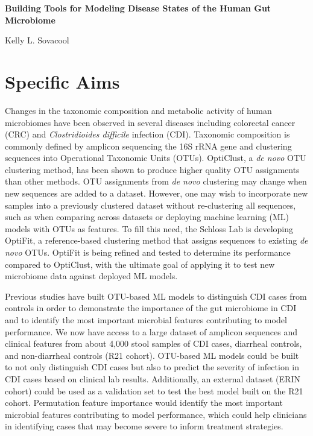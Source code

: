 \documentclass[11pt]{article}
\begin{document}
\sloppy
\begin{center}
\large{\textbf{
    Building Tools for Modeling Disease States of the Human Gut Microbiome
}}

\vspace{11pt}

\small{
    Kelly L. Sovacool
}
\end{center}

\section*{Specific Aims}

Changes in the taxonomic composition and metabolic activity of human microbiomes
have been observed in several diseases including colorectal cancer (CRC) and
\textit{Clostridioides difficile} infection (CDI).
Taxonomic composition is commonly defined by amplicon sequencing the 16S rRNA
gene and clustering sequences into Operational Taxonomic Units (OTUs).
OptiClust, a \textit{de novo} OTU clustering method, has been
shown to produce higher quality OTU assignments than other methods.
OTU assignments from \textit{de novo} clustering may
change when new sequences are added to a dataset.
However, one may wish to incorporate new samples into a previously clustered
dataset without re-clustering all sequences, such as when
comparing across datasets or deploying machine learning (ML) models with OTUs as
features.
To fill this need, the Schloss Lab is developing OptiFit, a reference-based
clustering method that assigns sequences to existing \textit{de novo} OTUs.
OptiFit is being refined and tested to determine its performance compared to
OptiClust, with the ultimate goal of applying it to test new microbiome data against deployed ML models.

Previous studies have built OTU-based ML models to distinguish CDI
cases from controls in order to demonstrate the importance of the gut microbiome
in CDI and to identify the most important microbial features contributing to
model performance.
We now have access to a large dataset of amplicon sequences and
clinical features from about 4,000 stool samples of CDI cases, diarrheal
controls, and non-diarrheal controls (R21 cohort).
OTU-based ML models could be built to not only distinguish CDI cases but also to
predict the severity of infection in CDI cases based on clinical lab results.
Additionally, an external dataset (ERIN cohort) could be used as a validation
set to test the best model built on the R21 cohort.
Permutation feature importance would identify the most important microbial
features contributing to model performance, which could help clinicians in
identifying cases that may become severe to inform treatment strategies.
\end{document}
